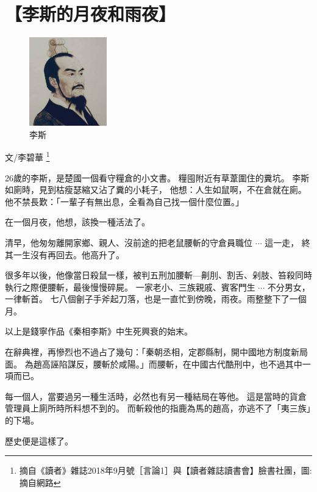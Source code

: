 
\chapter{【李斯的月夜和雨夜】}
\begin{figure}
\centering
\includegraphics[width=0.3\textwidth]{pics/p003.jpg}
\vspace{-25pt}
\caption{李斯}
\end{figure}

文/李碧華
\footnote{摘自《讀者》雜誌2018年9月號［言論1］與【讀者雜誌讀書會】臉書社團，圖:摘自網路}

26歲的李斯，是楚國一個看守糧倉的小文書。
糧囤附近有草葦圍住的糞坑。
李斯如廁時，見到枯瘦瑟縮又沾了糞的小耗子，
他想：人生如鼠啊，不在倉就在廁。
他不禁長歎：「一輩子有無出息，全看為自己找一個什麼位置。」

在一個月夜，他想，該換一種活法了。

清早，他匆匆離開家鄉、親人、沒前途的把老鼠腰斬的守倉員職位 $\cdots$ 這一走，
終其一生沒有再回去。他高升了。

很多年以後，他像當日殺鼠一樣，被判五刑加腰斬—劓刖、割舌、剁肢、笞殺同時執行之際便腰斬，最後慢慢碎屍。
一家老小、三族親戚、賓客門生 $\cdots$ 不分男女，一律斬首。
七八個劊子手斧起刀落，也是一直忙到傍晚，雨夜。雨整整下了一個月。

以上是錢寧作品{\Kai《秦相李斯》}中生死興衰的始末。

在辭典裡，再慘烈也不過占了幾句：「秦朝丞相，定郡縣制，開中國地方制度新局面。
為趙高誣陷謀反，腰斬於咸陽。」而腰斬，在中國古代酷刑中，也不過其中一項而已。

每一個人，當要過另一種生活時，必然也有另一種結局在等他。
這是當時的貨倉管理員上廁所時所料想不到的。
而斬殺他的指鹿為馬的趙高，亦逃不了「夷三族」的下場。

歷史便是這樣了。

